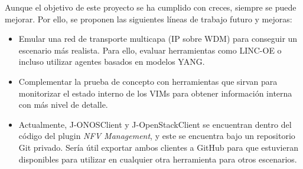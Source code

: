 Aunque el objetivo de este proyecto se ha cumplido con creces, siempre se puede mejorar. Por ello, se proponen las siguientes líneas de trabajo futuro y mejoras:

\begin{itemize}
	
	\item Emular una red de transporte multicapa (\ac{IP} sobre \ac{WDM}) para conseguir un escenario más realista. Para ello, evaluar herramientas como LINC-OE\cite{lincoebib} o incluso utilizar agentes basados en modelos \ac{YANG}.
	
	\item Complementar la prueba de concepto con herramientas que sirvan para monitorizar el estado interno de los \acp{VIM} para obtener información interna con más nivel de detalle.
	
	\item Actualmente, J-ONOSClient y J-OpenStackClient se encuentran dentro del código del plugin \textit{NFV Management}, y este se encuentra bajo un repositorio Git privado. Sería útil exportar ambos clientes a GitHub para que estuvieran disponibles para utilizar en cualquier otra herramienta para otros escenarios.
	
\end{itemize}

\cleardoublepage